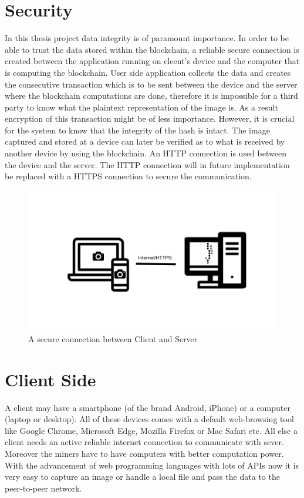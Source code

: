 \section{Security}
\label{sec:security}
In this thesis project data integrity is of paramount importance. In order to be able to trust the data stored within the blockchain, a reliable secure connection is created between the application running on cleent's device and the computer that is computing the blockchain. User side application collects the data and creates the consecutive transaction which is to be sent between the device and the server where the blockchain computations are done, therefore it is impossible for a third party to know what the plaintext representation of the image is.
As a result encryption of this transaction might be of less importance. However, it is crucial for the system to know that the integrity of the hash is intact. The image captured and stored at a device can later be verified as to what is received by another device by using the blockchain.
An HTTP connection is used between the device and the server. The HTTP connection will in future implementation be replaced with a HTTPS connection to secure the communication.

\begin{figure}
\begin{center}
\includegraphics[width=\textwidth]{./img_src/client_server.png}
\end{center}
\label{fig_connClientServer}
\caption{A secure connection between Client and Server}
\end{figure}

\section{Client Side}
\label{sec:client}
A client may have a smartphone (of the brand Android, iPhone) or a computer (laptop or desktop). All of these devices comes with a default web-browsing tool like Google Chrome, Microsoft Edge, Mozilla Firefox or Mac Safari etc. All else a client needs an active reliable internet connection to communicate with sever. Moreover the miners have to have computers with better computation power. With the advancement of web programming languages with lots of APIs now it is very easy to capture an image or handle a local file and pass the data to the peer-to-peer network.

